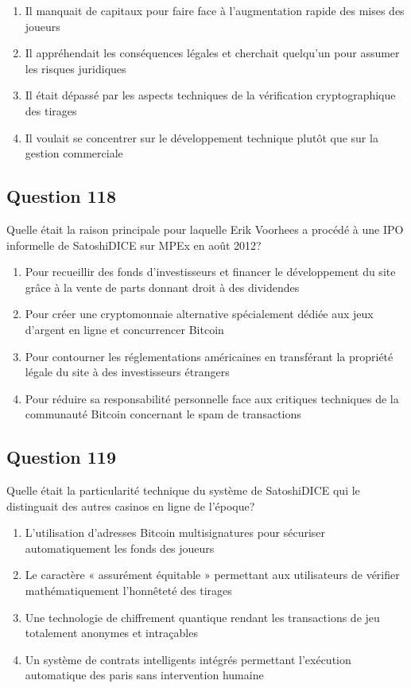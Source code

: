 \documentclass[12pt,a4paper]{article}
\begin{document}
\begin{enumerate}[label=\Alph*., leftmargin=*]
\item Il manquait de capitaux pour faire face à l'augmentation rapide des mises des joueurs
\item Il appréhendait les conséquences légales et cherchait quelqu'un pour assumer les risques juridiques
\item Il était dépassé par les aspects techniques de la vérification cryptographique des tirages
\item Il voulait se concentrer sur le développement technique plutôt que sur la gestion commerciale
\end{enumerate}

\bigskip


\subsection*{Question 118}
Quelle était la raison principale pour laquelle Erik Voorhees a procédé à une IPO informelle de SatoshiDICE sur MPEx en août 2012?

\begin{enumerate}[label=\Alph*., leftmargin=*]
\item Pour recueillir des fonds d'investisseurs et financer le développement du site grâce à la vente de parts donnant droit à des dividendes
\item Pour créer une cryptomonnaie alternative spécialement dédiée aux jeux d'argent en ligne et concurrencer Bitcoin
\item Pour contourner les réglementations américaines en transférant la propriété légale du site à des investisseurs étrangers
\item Pour réduire sa responsabilité personnelle face aux critiques techniques de la communauté Bitcoin concernant le spam de transactions
\end{enumerate}

\bigskip


\subsection*{Question 119}
Quelle était la particularité technique du système de SatoshiDICE qui le distinguait des autres casinos en ligne de l'époque?

\begin{enumerate}[label=\Alph*., leftmargin=*]
\item L'utilisation d'adresses Bitcoin multisignatures pour sécuriser automatiquement les fonds des joueurs
\item Le caractère « assurément équitable » permettant aux utilisateurs de vérifier mathématiquement l'honnêteté des tirages
\item Une technologie de chiffrement quantique rendant les transactions de jeu totalement anonymes et intraçables
\item Un système de contrats intelligents intégrés permettant l'exécution automatique des paris sans intervention humaine
\end{enumerate}
\end{document}

